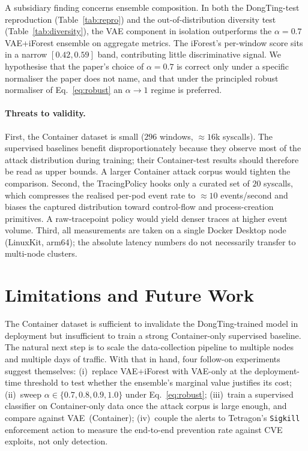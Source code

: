 A subsidiary finding concerns ensemble composition. In both the
DongTing-test reproduction (Table~\ref{tab:repro}) and the
out-of-distribution diversity test (Table~\ref{tab:diversity}), the
VAE component in isolation outperforms the $\alpha=0.7$
VAE+iForest ensemble on aggregate metrics. The iForest's per-window
score sits in a narrow $[0.42, 0.59]$ band, contributing little
discriminative signal. We hypothesise that the paper's choice of
$\alpha=0.7$ is correct only under a specific normaliser the paper
does not name, and that under the principled robust normaliser of
Eq.~\ref{eq:robust} an $\alpha\!\to\!1$ regime is preferred.

\paragraph{Threats to validity.}
First, the Container dataset is small ($296$ windows, $\approx\!16$k
syscalls). The supervised baselines benefit disproportionately because
they observe most of the attack distribution during training; their
Container-test results should therefore be read as upper bounds. A
larger Container attack corpus would tighten the comparison.
Second, the TracingPolicy hooks only a curated set of $20$ syscalls,
which compresses the realised per-pod event rate to $\approx\!10$
events/second and biases the captured distribution toward control-flow
and process-creation primitives. A raw-tracepoint policy would yield
denser traces at higher event volume. Third, all measurements are
taken on a single Docker Desktop node (LinuxKit, arm64); the absolute
latency numbers do not necessarily transfer to multi-node clusters.

\FloatBarrier
\section{Limitations and Future Work}
\label{sec:future}

The Container dataset is sufficient to invalidate the
DongTing-trained model in deployment but insufficient to train a
strong Container-only supervised baseline. The natural next step is
to scale the data-collection pipeline to multiple nodes and multiple
days of traffic. With that in hand, four follow-on experiments suggest
themselves: (i)~replace VAE+iForest with VAE-only at the
deployment-time threshold to test whether the ensemble's marginal
value justifies its cost; (ii)~sweep $\alpha\in\{0.7, 0.8, 0.9, 1.0\}$
under Eq.~\ref{eq:robust}; (iii)~train a supervised classifier on
Container-only data once the attack corpus is large enough, and
compare against VAE~(Container); (iv)~couple the alerts to Tetragon's
\texttt{Sigkill} enforcement action to measure the end-to-end
prevention rate against CVE exploits, not only detection.

